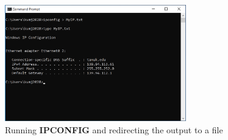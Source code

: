 \documentclass[12pt]{article}
\newenvironment{problem}[2][Problem]{\begin{trivlist}
\item[\hskip \labelsep {\bfseries #1}\hskip \labelsep {\bfseries #2.}]}{\end{trivlist}}
\begin{document}
\begin{problem}{1}
\begin{enumerate}
    \begin{figure}[H]
        \centering
        \includegraphics[width=0.7\textwidth]{ipconfig}
        \caption{Running \textbf{IPCONFIG} and redirecting the output to a file}
    \end{figure}
\end{enumerate}

\end{problem}
 
\end{document}
